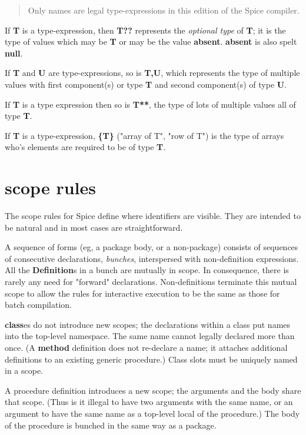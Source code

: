 \documentclass{report}
\begin{document}
\begin{quote}Only names are legal type-expressions in this edition of the Spice
compiler.\end{quote}

If {\bf T} is a type-expression, then {\bf T??} represents the {\em optional type}
of {\bf T}; it is the type of values which may be {\bf T} or may be the value
{\bf absent}. {\bf absent} is also spelt {\bf null}.

If {\bf T} and {\bf U} are type-expressions, so is {\bf T,U}, which represents the
type of multiple values with first component(s) or type {\bf T} and second
component(s) of type {\bf U}.

If {\bf T} is a type expression then so is {\bf T**}, the type of lots of
multiple values all of type {\bf T}.

If {\bf T} is a type-expression, {\bf \{T\}} ("array of T", "row of T") is the
type of arrays who's elements are required to be of type {\bf T}.\chapter{scope rules}


The scope rules for Spice define where identifiers are visible. They are
intended to be natural and in most cases are straightforward.

A sequence of forms (eg, a package body, or a non-package)
consists of sequences of consecutive declarations, {\em bunches}, interspersed
with non-definition expressions. All the {\bf Definition}s in a bunch are mutually
in scope. In consequence, there is rarely any need for "forward" declarations.
Non-definitions terminate this mutual scope to allow the rules for interactive
execution to be the same as those for batch compilation.

{\bf class}es do not introduce new scopes; the declarations within a class put
names into the top-level namespace. The same name cannot legally declared more
than once. (A {\bf method} definition does not re-declare a name; it attaches
additional definitions to an existing generic procedure.) Class slots must be
uniquely named in a scope.

A procedure definition introduces a new scope; the arguments and the body
share that scope. (Thus is it illegal to have two arguments with the same
name, or an argument to have the same name as a top-level local of the
procedure.) The body of the procedure is bunched in the same way as a package.
\end{document}
